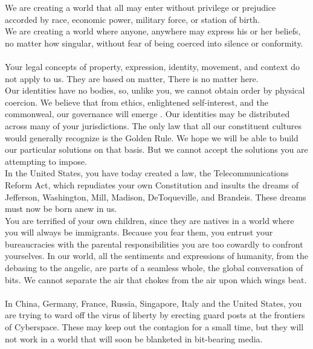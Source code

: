 \documentclass[11pt,twoside,a4paper]{book}
\begin{document}
\begin{center}
\begin{minipage}[ht]{0.95\textwidth}
	We are creating a world that all may enter without privilege or prejudice accorded by race, economic power, military force, or station of birth. ~\\
	
	We are creating a world where anyone, anywhere may express his or her beliefs, no matter how singular, without fear of being coerced into silence or conformity. ~\\
	
	Your legal concepts of property, expression, identity, movement, and context do not apply to us. They are based on matter, There is no matter here. ~\\
	
	Our identities have no bodies, so, unlike you, we cannot obtain order by physical coercion. We believe that from ethics, enlightened self-interest, and the commonweal, our governance will emerge . Our identities may be distributed across many of your jurisdictions. The only law that all our constituent cultures would generally recognize is the Golden Rule. We hope we will be able to build our particular solutions on that basis.  But we cannot accept the solutions you are attempting to impose. ~\\
	
	In the United States, you have today created a law, the Telecommunications Reform Act, which repudiates your own Constitution and insults the dreams of Jefferson, Washington, Mill, Madison, DeToqueville, and Brandeis. These dreams must now be born anew in us. ~\\
	
	You are terrified of your own children, since they are natives in a world where you will always be immigrants. Because you fear them, you entrust your bureaucracies with the parental responsibilities you are too cowardly to confront yourselves. In our world, all the sentiments and expressions of humanity, from the debasing to the angelic, are parts of a seamless whole, the global conversation of bits. We cannot separate the air that chokes from the air upon which wings beat. ~\\
	
	In China, Germany, France, Russia, Singapore, Italy and the United States, you are trying to ward off the virus of liberty by erecting guard posts at the frontiers of Cyberspace. These may keep out the contagion for a small time, but they will not work in a world that will soon be blanketed in bit-bearing media. ~\\
	

\end{minipage}
\end{center}
\end{document}
